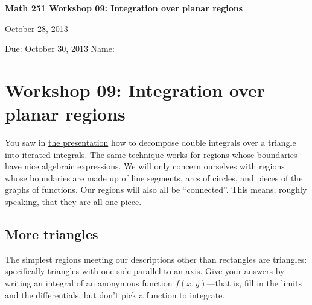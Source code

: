 \documentclass[12pt]{exam}
\theoremstyle{definition}
\begin{document}
\noindent
\textbf{{\large Math 251 \hfill Workshop 09: Integration over planar regions}}

\noindent
October 28, 2013 

\noindent
Due: October 30, 2013 \hfill Name: \underline{\hspace{3in}} 

\noindent

\section{Workshop 09: Integration over planar regions}

You saw in \href{../../decks/13/Deck.pdf}{the presentation} how to
decompose double integrals over a triangle into iterated integrals. The
same technique works for regions whose boundaries have nice algebraic
expressions. We will only concern ourselves with regions whose
boundaries are made up of line segments, arcs of circles, and pieces of
the graphs of functions. Our regions will also all be ``connected''.
This means, roughly speaking, that they are all one piece.

\subsection{More triangles}

The simplest regions meeting our descriptions other than rectangles are
triangles: specifically triangles with one side parallel to an axis.
Give your answers by writing an integral of an anonymous function
$f(x,y)$---that is, fill in the limits and the differentials, but don't
pick a function to integrate.
\end{document}
